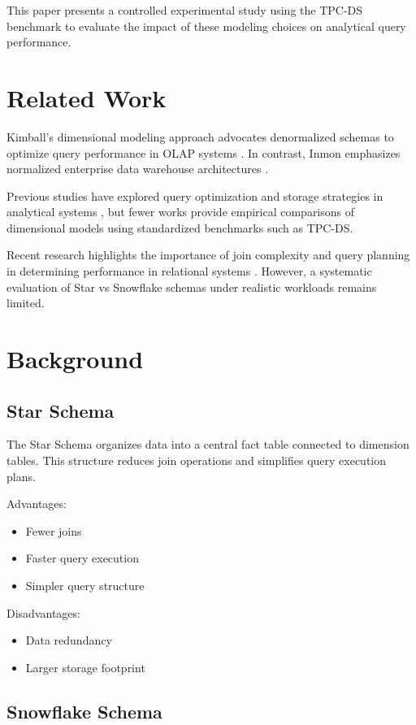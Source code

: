 \documentclass[conference]{IEEEtran}
\begin{document}
This paper presents a controlled experimental study using the TPC-DS benchmark to evaluate the impact of these modeling choices on analytical query performance.

\section{Related Work}

Kimball's dimensional modeling approach advocates denormalized schemas to optimize query performance in OLAP systems \cite{kimball}. In contrast, Inmon emphasizes normalized enterprise data warehouse architectures \cite{inmon}.

Previous studies have explored query optimization and storage strategies in analytical systems \cite{abadi}, but fewer works provide empirical comparisons of dimensional models using standardized benchmarks such as TPC-DS.

Recent research highlights the importance of join complexity and query planning in determining performance in relational systems \cite{stonebraker}. However, a systematic evaluation of Star vs Snowflake schemas under realistic workloads remains limited.

\section{Background}

\subsection{Star Schema}

The Star Schema organizes data into a central fact table connected to dimension tables. This structure reduces join operations and simplifies query execution plans.

Advantages:
\begin{itemize}
    \item Fewer joins
    \item Faster query execution
    \item Simpler query structure
\end{itemize}

Disadvantages:
\begin{itemize}
    \item Data redundancy
    \item Larger storage footprint
\end{itemize}

\subsection{Snowflake Schema}
\end{document}
